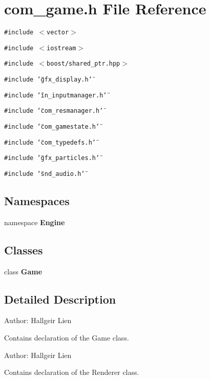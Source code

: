 \section{com\_\-game.h File Reference}
\label{com__game_8h}
{\tt \#include $<$vector$>$}\par
{\tt \#include $<$iostream$>$}\par
{\tt \#include $<$boost/shared\_\-ptr.hpp$>$}\par
{\tt \#include \char`\"{}gfx\_\-display.h\char`\"{}}\par
{\tt \#include \char`\"{}in\_\-inputmanager.h\char`\"{}}\par
{\tt \#include \char`\"{}com\_\-resmanager.h\char`\"{}}\par
{\tt \#include \char`\"{}com\_\-gamestate.h\char`\"{}}\par
{\tt \#include \char`\"{}com\_\-typedefs.h\char`\"{}}\par
{\tt \#include \char`\"{}gfx\_\-particles.h\char`\"{}}\par
{\tt \#include \char`\"{}snd\_\-audio.h\char`\"{}}\par
\subsection*{Namespaces}
\begin{CompactItemize}
\item 
namespace {\bf Engine}
\end{CompactItemize}
\subsection*{Classes}
\begin{CompactItemize}
\item 
class {\bf Game}
\end{CompactItemize}


\subsection{Detailed Description}
\begin{Desc}
\item[Author:]Hallgeir Lien\end{Desc}
Contains declaration of the Game class.

\begin{Desc}
\item[Author:]Hallgeir Lien\end{Desc}
Contains declaration of the Renderer class. 
